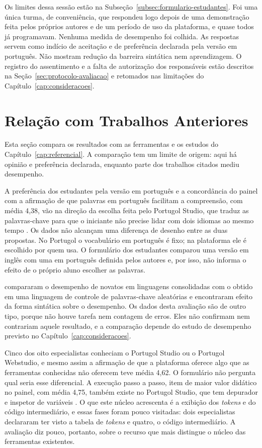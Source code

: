 Os limites dessa sessão estão na Subseção~\ref{subsec:formulario-estudantes}. Foi uma única turma, de conveniência, que respondeu logo depois de uma demonstração feita pelos próprios autores e de um período de uso da plataforma, e quase todos já programavam. Nenhuma medida de desempenho foi colhida. As respostas servem como indício de aceitação e de preferência declarada pela versão em português. Não mostram redução da barreira sintática nem aprendizagem. O registro do assentimento e a falta de autorização dos responsáveis estão descritos na Seção~\ref{sec:protocolo-avaliacao} e retomados nas limitações do Capítulo~\ref{cap:consideracoes}.

\section{Relação com Trabalhos Anteriores}
\label{sec:resultado-literatura}

Esta seção compara os resultados com as ferramentas e os estudos do Capítulo~\ref{cap:referencial}. A comparação tem um limite de origem: aqui há opinião e preferência declarada, enquanto parte dos trabalhos citados mediu desempenho.

A preferência dos estudantes pela versão em português e a concordância do painel com a afirmação de que palavras em português facilitam a compreensão, com média 4,38, vão na direção da escolha feita pelo Portugol Studio, que traduz as palavras-chave para que o iniciante não precise lidar com dois idiomas ao mesmo tempo \cite{univali2026}. Os dados não alcançam uma diferença de desenho entre as duas propostas. No Portugol o vocabulário em português é fixo; na plataforma ele é escolhido por quem usa. O formulário dos estudantes comparou uma versão em inglês com uma em português definida pelos autores e, por isso, não informa o efeito de o próprio aluno escolher as palavras.

 compararam o desempenho de novatos em linguagens consolidadas com o obtido em uma linguagem de controle de palavras-chave aleatórias e encontraram efeito da forma sintática sobre o desempenho. Os dados desta avaliação são de outro tipo, porque não houve tarefa nem contagem de erros. Eles não confirmam nem contrariam aquele resultado, e a comparação depende do estudo de desempenho previsto no Capítulo~\ref{cap:consideracoes}.

Cinco dos oito especialistas conheciam o Portugol Studio ou o Portugol Webstudio, e mesmo assim a afirmação de que a plataforma oferece algo que as ferramentas conhecidas não oferecem teve média 4,62. O formulário não pergunta qual seria esse diferencial. A execução passo a passo, item de maior valor didático no painel, com média 4,75, também existe no Portugol Studio, que tem depurador e inspetor de variáveis \cite{univali2026}. O que este núcleo acrescenta é a exibição dos \textit{tokens} e do código intermediário, e essas fases foram pouco visitadas: dois especialistas declararam ter visto a tabela de \textit{tokens} e quatro, o código intermediário. A avaliação diz pouco, portanto, sobre o recurso que mais distingue o núcleo das ferramentas existentes.

